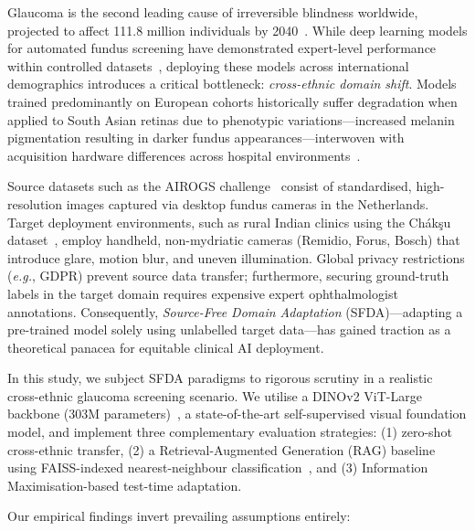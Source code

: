 \documentclass[11pt,twocolumn]{article}
\newcommand{\eg}{\emph{e.g.}}
\begin{document}
Glaucoma is the second leading cause of irreversible blindness worldwide, projected to affect 111.8 million individuals by 2040~\citep{tham2014global}. While deep learning models for automated fundus screening have demonstrated expert-level performance within controlled datasets~\citep{li2018efficacy, ting2019ai}, deploying these models across international demographics introduces a critical bottleneck: \emph{cross-ethnic domain shift}. Models trained predominantly on European cohorts historically suffer degradation when applied to South Asian retinas due to phenotypic variations---increased melanin pigmentation resulting in darker fundus appearances---interwoven with acquisition hardware differences across hospital environments~\citep{rajesh2025rps}.

Source datasets such as the AIROGS challenge~\citep{vermeer2024airogs} consist of standardised, high-resolution images captured via desktop fundus cameras in the Netherlands. Target deployment environments, such as rural Indian clinics using the Ch\'{a}k\c{s}u dataset~\citep{kumar2023chakshu}, employ handheld, non-mydriatic cameras (Remidio, Forus, Bosch) that introduce glare, motion blur, and uneven illumination. Global privacy restrictions (\eg, GDPR) prevent source data transfer; furthermore, securing ground-truth labels in the target domain requires expensive expert ophthalmologist annotations. Consequently, \emph{Source-Free Domain Adaptation} (SFDA)---adapting a pre-trained model solely using unlabelled target data---has gained traction as a theoretical panacea for equitable clinical AI deployment.

In this study, we subject SFDA paradigms to rigorous scrutiny in a realistic cross-ethnic glaucoma screening scenario. We utilise a DINOv2 ViT-Large backbone (303M parameters)~\citep{oquab2024dinov2}, a state-of-the-art self-supervised visual foundation model, and implement three complementary evaluation strategies: (1) zero-shot cross-ethnic transfer, (2) a Retrieval-Augmented Generation (RAG) baseline using FAISS-indexed nearest-neighbour classification~\citep{johnson2019faiss}, and (3) Information Maximisation-based test-time adaptation.

Our empirical findings invert prevailing assumptions entirely:
\end{document}
